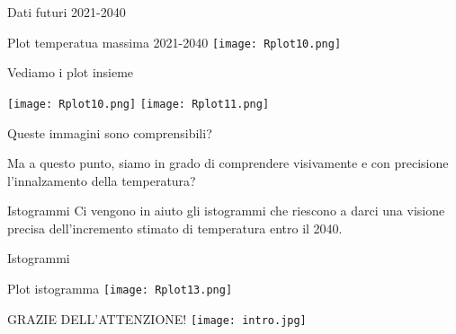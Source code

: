 \documentclass{beamer}
\begin{document}
\begin{frame}{Dati futuri 2021-2040}
\bigskip

\tiny 
    
\end{frame}
\begin{frame}{Plot temperatua massima 2021-2040}
    \centering
\texttt{[image: Rplot10.png]}  
\end{frame}

\begin{frame}{Vediamo i plot insieme}
\tiny 

\centering
\texttt{[image: Rplot10.png]}  
\texttt{[image: Rplot11.png]}  
\end{frame}
\begin{frame}{Queste immagini sono comprensibili?}

Ma a questo punto, siamo in grado di comprendere visivamente e con precisione l'innalzamento della temperatura?

    
\end{frame}


\begin{frame}{Istogrammi}
Ci vengono in aiuto gli istogrammi che riescono a darci una visione precisa dell'incremento stimato di temperatura entro il 2040.
    
\end{frame}



\begin{frame}{Istogrammi}
\centering
    \tiny 
\end{frame}

\begin{frame}{Plot istogramma}
\centering
\texttt{[image: Rplot13.png]}  
    
\end{frame}


\begin{frame}
\centering
    GRAZIE DELL'ATTENZIONE!
    \texttt{[image: intro.jpg]}  
\end{frame}
\end{document}
